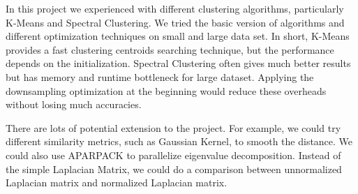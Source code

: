 \documentclass{acm_proc_article-sp}
\begin{document}
In this project we experienced with different clustering algorithms, particularly K-Means and Spectral Clustering. We tried the basic version of algorithms and different optimization techniques on small and large data set. In short, K-Means provides a fast clustering centroids searching technique, but the performance depends on the initialization. Spectral Clustering often gives much better results but has memory and runtime bottleneck for large dataset. Applying the downsampling optimization at the beginning would reduce these overheads without losing much accuracies.  

There are lots of potential extension to the project. For example, we could try different similarity metrics, such as Gaussian Kernel, to smooth the distance. We could also use APARPACK to parallelize eigenvalue decomposition. Instead of the simple Laplacian Matrix, we could do a comparison  between unnormalized Laplacian matrix and normalized Laplacian matrix.

%
%

\balancecolumns
\end{document}
